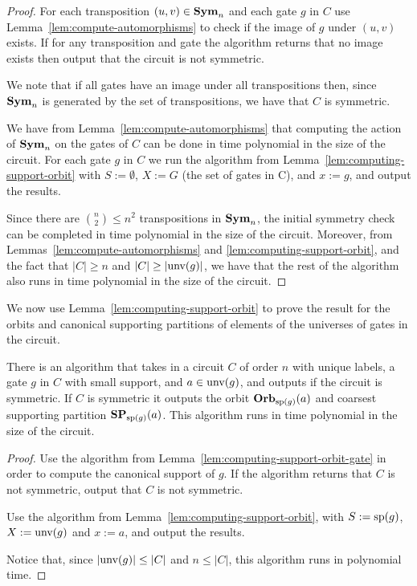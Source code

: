 \documentclass[../paper.tex]{subfiles}
\begin{document}
\begin{proof}
  For each transposition $(u,v) \in \text{\textbf{Sym}}_n$ and each gate $g$ in $C$ use
  Lemma~\ref{lem:compute-automorphisms} to check if the image of $g$ under
  $(u,v)$ exists. If for any transposition and gate the algorithm returns that
  no image exists then output that the circuit is not symmetric.

  We note that if all gates have an image under all transpositions then, since
  $\text{\textbf{Sym}}_n$ is generated by the set of transpositions, we have that $C$ is
  symmetric.
  
  We have from Lemma~\ref{lem:compute-automorphisms} that computing the action
  of $\text{\textbf{Sym}}_n$ on the gates of $C$ can be done in time polynomial in the size of
  the circuit. For each gate $g$ in $C$ we run the algorithm from
  Lemma~\ref{lem:computing-support-orbit} with $S := \emptyset$, $X := G$ (the
  set of gates in C), and $x := g$, and output the results.
  
  Since there are ${{n}\choose{2}} \leq n^2$ transpositions in $\text{\textbf{Sym}}_n$, the
  initial symmetry check can be completed in time polynomial in the size of the
  circuit. Moreover, from Lemmas~\ref{lem:compute-automorphisms} and
  \ref{lem:computing-support-orbit}, and the fact that $\vert C \vert \geq n$
  and $\vert C \vert \geq \vert \text{unv}(g) \vert$, we have that the rest of
  the algorithm also runs in time polynomial in the size of the circuit.
\end{proof}

We now use Lemma~\ref{lem:computing-support-orbit} to prove the result for the
orbits and canonical supporting partitions of elements of the universes of gates
in the circuit.

\begin{lem}
  There is an algorithm that takes in a circuit $C$ of order $n$ with unique
  labels, a gate $g$ in $C$ with small support, and $a \in \text{unv}(g)$, and
  outputs if the circuit is symmetric. If $C$ is symmetric it outputs the orbit
  $\text{\textbf{Orb}}_{\text{sp}(g)} (a)$ and coarsest supporting partition $\text{\textbf{SP}}_{\text{sp}(g)}(a)$.
  This algorithm runs in time polynomial in the size of the circuit.
  \label{lem:computing-support-orbit-index}
\end{lem}
\begin{proof}
  Use the algorithm from Lemma~\ref{lem:computing-support-orbit-gate} in order
  to compute the canonical support of $g$. If the algorithm returns that $C$ is
  not symmetric, output that $C$ is not symmetric.

  Use the algorithm from Lemma~\ref{lem:computing-support-orbit}, with $S :=
  \text{sp}(g)$, $X := \text{unv}(g)$ and $x:= a$, and output the results.

  Notice that, since $\vert \text{unv}(g) \vert \leq \vert C \vert$ and $n \leq
  \vert C \vert$, this algorithm runs in polynomial time.
\end{proof}
\end{document}
